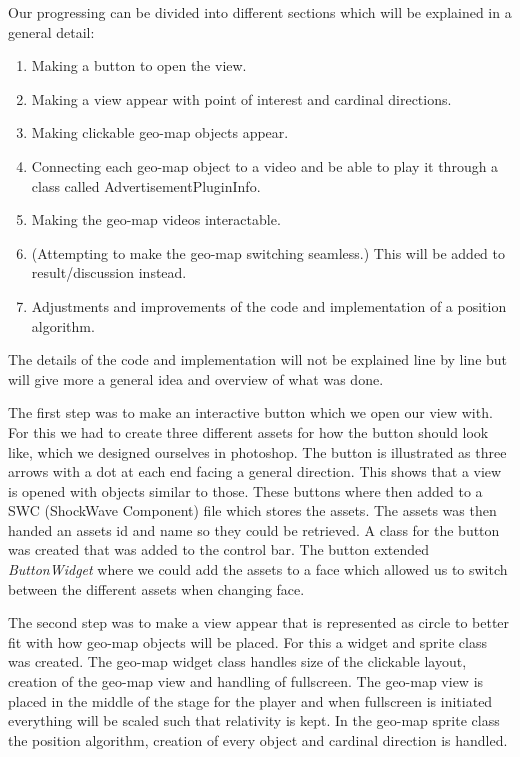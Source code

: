 \documentclass[9pt,a4paper]{acmproc}
\begin{document}
Our progressing can be divided into different sections which will be explained in a general detail:

\begin{enumerate}
\item Making a button to open the view.

\item Making a view appear with point of interest and cardinal directions.

\item Making clickable geo-map objects appear.

\item Connecting each geo-map object to a video and be able to play it through a class called AdvertisementPluginInfo.

\item Making the geo-map videos interactable.

\item (Attempting to make the geo-map switching seamless.)
This will be added to result/discussion instead.

\item Adjustments and improvements of the code and implementation of a position algorithm. 
\end{enumerate}

The details of the code and implementation will not be explained line by line but will give more a general idea and overview of what was done.

The first step was to make an interactive button which we open our view with. For this we had to create three different assets for how the button should look like, which we designed ourselves in photoshop. The button is illustrated as three arrows with a dot at each end facing a general direction. This shows that a view is opened with objects similar to those. These buttons where then added to a SWC (ShockWave Component) file which stores the assets. The assets was then handed an assets id and name so they could be retrieved. A class for the button was created that was added to the control bar. The button extended \textit{ButtonWidget} where we could add the assets to a face which allowed us to switch between the different assets when changing face. 

The second step was to make a view appear that is represented as circle to better fit with how geo-map objects will be placed. For this a widget and sprite class was created. The geo-map widget class handles size of the clickable layout, creation of the geo-map view and handling of fullscreen. The geo-map view is placed in the middle of the stage for the player and when fullscreen is initiated everything will be scaled such that relativity is kept. In the geo-map sprite class the position algorithm, creation of every object and cardinal direction is handled.
\end{document}
